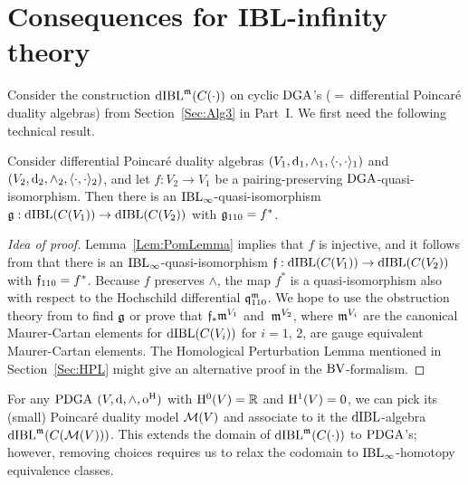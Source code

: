 \documentclass[\MainFolder/Text.tex]{subfiles}
\begin{document}
\section{Consequences for IBL-infinity theory}\label{Section:FuncIBL}

Consider the construction $\mathrm{dIBL}^{\mathfrak{m}}(C(\cdot))$ on cyclic $\mathrm{DGA}$'s ($=$\,differential Poincar\'e duality algebras) from Section~\ref{Sec:Alg3} in Part~I. We first need the following technical result.

\begin{Conjecture}\label{Conj:Functorialityo}
Consider differential Poincar\'e duality algebras $(V_1,\mathrm{d}_1,\wedge_1,\langle\cdot,\cdot\rangle_1)$ and $(V_2,\mathrm{d}_2,\wedge_2,\langle\cdot,\cdot\rangle_2)$, and let $f: V_2 \rightarrow V_1$ be a pairing-preserving $\mathrm{DGA}$-quasi-isomorphism. Then there is an $\mathrm{IBL}_\infty$-quasi-isomorphism $\mathfrak{g}: \mathrm{dIBL}(C(V_1)) \rightarrow \mathrm{dIBL}(C(V_2))$ with $\mathfrak{g}_{110} = f^*$.
\end{Conjecture}

\begin{proof}[Idea of proof]
Lemma~\ref{Lem:PomLemma} implies that $f$ is injective, and it follows from \cite[Theorem~11.3]{Cieliebak2015} that there is an $\mathrm{IBL}_\infty$-quasi-isomorphism $\mathfrak{f}: \mathrm{dIBL}(C(V_1)) \rightarrow \mathrm{dIBL}(C(V_2))$ with $\mathfrak{f}_{110} = f^*$. Because $f$ preserves $\wedge$, the map $f^*$ is a quasi-isomorphism also with respect to the Hochschild differential $\mathfrak{q}_{110}^{\mathfrak{m}}$. We hope to use the obstruction theory from \cite[Section~3]{Cieliebak2015} to find $\mathfrak{g}$ or prove that $\mathfrak{f}_*\mathfrak{m}^{V_1}$ and~$\mathfrak{m}^{V_2}$, where $\mathfrak{m}^{V_i}$ are the canonical Maurer-Cartan elements for $\mathrm{dIBL}(C(V_i))$ for $i=1$, $2$, are gauge equivalent Maurer-Cartan elements. The Homological Perturbation Lemma mentioned in Section~\ref{Sec:HPL} might give an alternative proof in the $\mathrm{BV}$-formalism.
\end{proof}

For any $\mathrm{PDGA}$ $(V,\dd,\wedge,\mathrm{o}^{\mathrm{H}})$ with $\mathrm{H}^0(V)=\mathbb{R}$ and $\mathrm{H}^1(V)=0$, we can pick its (small) Poincar\'e duality model $\mathcal{M}(V)$ and associate to it the $\mathrm{dIBL}$-algebra $\mathrm{dIBL}^{\mathfrak{m}}(C(\mathcal{M}(V)))$. This extends the domain of $\mathrm{dIBL}^{\mathfrak{m}}(C(\cdot))$ to $\mathrm{PDGA}$'s; however, removing choices requires us to relax the codomain to $\mathrm{IBL}_\infty$-homotopy equivalence classes.
\end{document}
